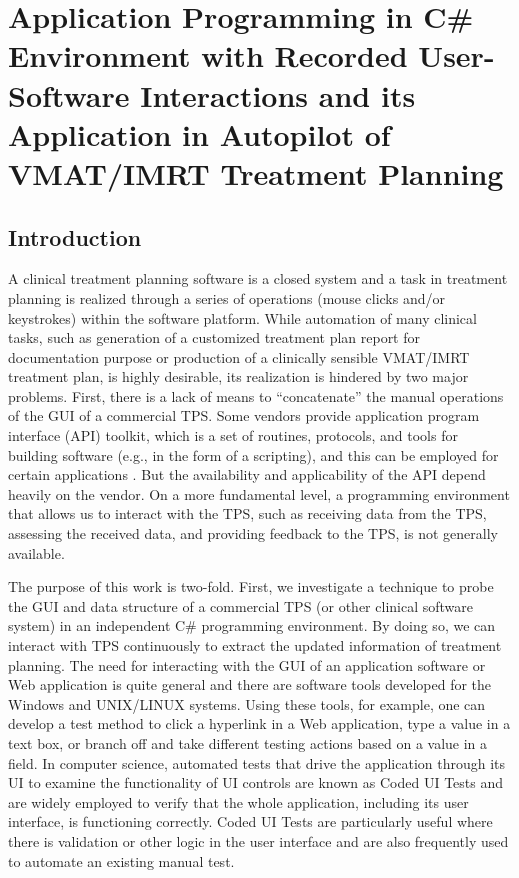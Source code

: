 \chapter{Application Programming in C\# Environment with Recorded User-Software Interactions and its Application in Autopilot of VMAT/IMRT Treatment Planning}  \label{cha:chap3}
    
       
\section{Introduction}
A clinical treatment planning software is a closed system and a task in treatment planning is realized through a series of operations (mouse clicks and/or keystrokes) within the software platform.  While automation of many clinical tasks, such as generation of a customized treatment plan report for documentation purpose or production of a clinically sensible VMAT/IMRT treatment plan, is highly desirable, its realization is hindered by two major problems. First, there is a lack of means to ``concatenate'' the manual operations of the GUI of a commercial TPS. Some vendors provide application program interface (API) toolkit, which is a set of routines, protocols, and tools for building software (e.g., in the form of a scripting), and this can be employed for certain applications \cite{xhaferllari2013, wu2005}. But the availability and applicability of the API depend heavily on the vendor. On a more fundamental level, a programming environment that allows us to interact with the TPS, such as receiving data from the TPS, assessing the received data, and providing feedback to the TPS, is not generally available.  

The purpose of this work is two-fold. First, we investigate a technique to probe the GUI and data structure of a commercial TPS (or other clinical software system) in an independent C\# programming environment. By doing so, we can interact with TPS continuously to extract the updated information of treatment planning. The need for interacting with the GUI of an application software or Web application is quite general and there are software tools developed for the Windows and UNIX/LINUX systems. Using these tools, for example, one can develop a test method to click a hyperlink in a Web application, type a value in a text box, or branch off and take different testing actions based on a value in a field. In computer science, automated tests that drive the application through its UI to examine the functionality of UI controls are known as Coded UI Tests and are widely employed to verify that the whole application, including its user interface, is functioning correctly. Coded UI Tests are particularly useful where there is validation or other logic in the user interface and are also frequently used to automate an existing manual test. 

